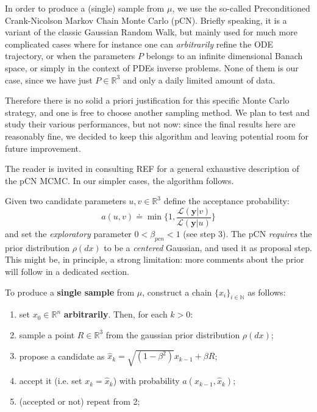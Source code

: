 \documentclass[8pt]{article}
\begin{document}
In order to produce a (single) sample from $\mu$,
we use the so-called Preconditioned
Crank-Nicolson Markov Chain Monte Carlo (pCN).
Briefly speaking, it is a variant of the classic
Gaussian Random Walk, but mainly used for much more complicated cases
where for instance one can \emph{arbitrarily} refine the ODE
trajectory, or when the parameters $P$ belongs to 
an infinite dimensional Banach space, or simply in the context of
PDEs inverse problems.
None of them is our case, since we have just $P \in \mathbb{R}^3$ and
only a daily limited amount of data.


Therefore there is no solid a priori justification for this specific 
Monte Carlo strategy, and one is free to choose another sampling method.
We plan to test and study their various performances, but not now:
since the final results here are reasonably fine, we decided
to keep this algorithm and leaving potential room for future improvement.


The reader is invited in consulting REF for a general exhaustive description
of the pCN MCMC. In our simpler cases, the algorithm follows.


Given two candidate parameters $u, v \in \mathbb{R}^3$
define the acceptance probability:
\begin{equation}
	a(u, v) \doteq \min \{ 1, \frac{ \mathcal{L}(\textbf{y} | v )}
				{\mathcal{L}(\textbf{y} | u)} \}
\end{equation}
and set the \emph{exploratory} parameter $0 < \beta_{pcn} < 1$
(see step 3).
The pCN \emph{requires} the prior distribution $\rho(dx)$
to be a \emph{centered} Gaussian, and used it as proposal step.
This might be, in principle, a strong limitation: more comments about the
prior will follow in a dedicated section.


To produce a \textbf{single sample} from $\mu$, construct a chain 
$\{ x_i \} _{i \in \mathbb{N} }$ as follows:

\begin{enumerate}
	\item set $x_0 \in \mathbb{R}^n$ \textbf{arbitrarily}. Then, for each
		$k > 0$:
	\item sample a point $R \in \mathbb{R}^3$ 
		from the gaussian prior distribution $\rho(dx)$;

	\item  propose a candidate as 
		$
		\hat{x}_{k} = \sqrt{(1 - \beta^2)} x_{k-1}
			+ \beta R
		$;
	\item	accept it (i.e. set $x_{k} = \hat{x}_{k}$)
		with probability $a(x_{k-1}, \hat{x}_k)$;
	\item (accepted or not) repeat from 2;
\end{enumerate}
\end{document}
